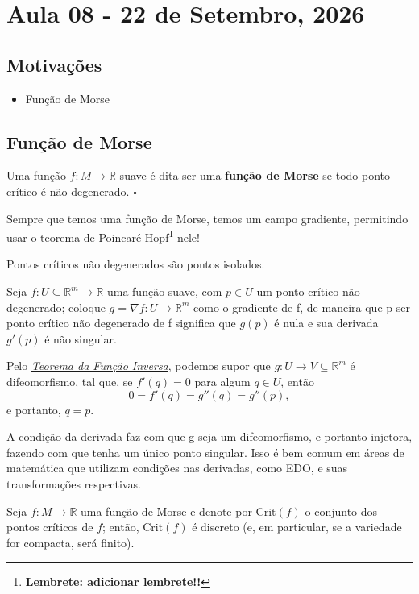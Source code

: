 \documentclass[../differential_topology.tex]{subfiles}
\begin{document}
\section{Aula 08 - 22 de Setembro, 2026}
\subsection{Motivações}
\begin{itemize}
	\item Função de Morse
\end{itemize}
\subsection{Função de Morse}
\begin{def*}
	Uma função \(f:M\rightarrow \mathbb{R}\) suave é dita ser uma \textbf{função de Morse} se todo ponto crítico é não degenerado. \(\square\)
\end{def*}
Sempre que temos uma função de Morse, temos um campo gradiente, permitindo usar o teorema de Poincaré-Hopf\footnote{\textbf{Lembrete: adicionar lembrete!!}} nele!
\begin{prop*}
	Pontos críticos não degenerados são pontos isolados.
\end{prop*}
\begin{proof*}
	Seja \(f:U\subseteq \mathbb{R}^{m}\rightarrow \mathbb{R}\) uma função suave, com \(p\in U\) um ponto crítico não degenerado; coloque \(g = \nabla f:U\rightarrow \mathbb{R}^{m}\) como o gradiente de f, de maneira que p ser ponto crítico não degenerado de f significa que \(g(p)\) é nula e sua derivada \(g'(p)\) é não singular.

	Pelo \hyperlink{inverse_function}{\textit{Teorema da Função Inversa}}, podemos supor que \(g:U\rightarrow V\subseteq \mathbb{R}^{m}\) é difeomorfismo, tal que, se \(f'(q) = 0\) para algum \(q\in U\), então
	\[
		0 = f'(q) = g''(q) = g''(p),
	\]
	e portanto, \(q=p\). \qedsymbol
\end{proof*}
A condição da derivada faz com que g seja um difeomorfismo, e portanto injetora, fazendo com que tenha um único ponto singular. Isso é bem comum em áreas de matemática que utilizam condições nas derivadas, como EDO, e suas transformações respectivas.

\begin{crl*}
	Seja \(f:M\rightarrow \mathbb{R}\) uma função de Morse e denote por \(\mathrm{Crit}(f)\) o conjunto dos pontos críticos de \(f\); então, \(\mathrm{Crit}(f)\) é discreto (e, em particular, se a variedade for compacta, será finito).
\end{crl*}
\end{document}
